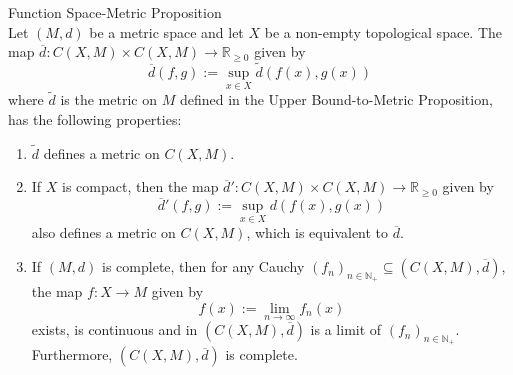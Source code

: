 \begin{proposition}{Function Space-Metric Proposition}\\
Let $(M,d)$ be a metric space and let $X$ be a non-empty topological space. The map $\overline{d} : C(X,M) \times C(X,M) \to \mathbb{R}_{\geq 0}$ given by
$$\overline{d} (f,g) := \sup_{x \in X} \tilde{d} (f(x),g(x))$$
where $\tilde{d}$ is the metric on $M$ defined in the Upper Bound-to-Metric Proposition, has the following properties:
\begin{enumerate}
    \item $\tilde{d}$ defines a metric on $C(X,M)$.
    \item If $X$ is compact, then the map $\overline{d}': C(X,M) \times C(X,M) \to \mathbb{R}_{\geq 0}$ given by
    $$\overline{d}' (f,g) := \sup_{x \in X} d(f(x),g(x))$$
    also defines a metric on $C(X,M)$, which is equivalent to $\overline{d}$.

    \item If $(M,d)$ is complete, then for any Cauchy $(f_n)_{n \in \mathbb{N}_+} \subseteq (C(X,M),\overline{d})$, the map $f:X \to M$ given by
    $$f(x) := \lim_{n \to \infty} f_n(x)$$
    exists, is continuous and in $(C(X,M), \overline{d})$ is a limit of $(f_n)_{n \in \mathbb{N}_+}$. Furthermore, $(C(X,M), \overline{d})$ is complete.
\end{enumerate}
\end{proposition}

